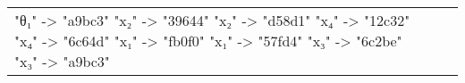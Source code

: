 \documentclass{beamer}
\begin{document}
\begin{frame}[fragile]
\begin{table}[H]
\begin{tabular}{lll}
\begin{adjustbox}{minipage={.4\textwidth}, height=0.22\textwidth, margin*=0cm 0cm 0cm 0.1cm}
{                          "θ₁" -> "a9bc3"
                          "x₂" -> "39644"
                          "x₂" -> "d58d1"
                          "x₄" -> "12c32"
                          "x₄" -> "6c64d"
                          "x₁" -> "fb0f0"
                          "x₁" -> "57fd4"
                          "x₃" -> "6c2be"
                          "x₃" -> "a9bc3"
                      } \end{adjustbox}
            \end{tabular}
        \end{table}
    \end{frame}
\end{document}
